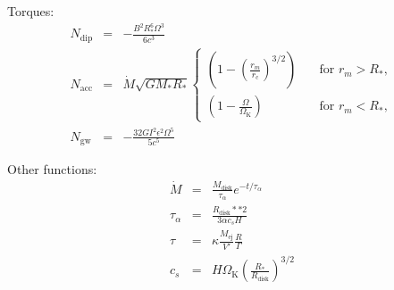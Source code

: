 \documentclass[11pt]{article} %
\newcommand{\tx}[1]{\textrm{#1}}
\begin{document}
Torques:
\begin{eqnarray}
N_\tx{dip}		&=& -\frac{B^2R_*^6\Omega^3}{6c^3} \\
N_\tx{acc}		&=& \dot{M}\sqrt{GM_*R_*}
				\left\{\begin{array}{ll} 
                                   \left(1-\left(\tfrac{r_m}{r_\tx{c}}\right)^{3/2}\right)&\quad\tx{for\ }r_m>R_*, \\
			        \left(1-\tfrac{\Omega}{\Omega_\tx{K}}\right)&\quad\tx{for\ }r_m<R_*,
			        \end{array}\right. \\
N_\tx{gw}		&=& -\frac{32GI^2\epsilon^2\Omega^5}{5c^5} 
\end{eqnarray}

Other functions:
\begin{eqnarray}
\dot{M}		&=& \frac{M_\tx{disk}}{\tau_\alpha}e^{-t/\tau_\alpha} \\
\tau_\alpha	&=& \frac{R_\tx{disk}**2}{3\alpha c_s H} \\
\tau			&=& \kappa\frac{M_\tx{ej}}{V'}\frac{R}{\Gamma} \\
c_s 			&=& H\Omega_\tx{K}\left(\tfrac{R_*}{R_\tx{disk}}\right)^{3/2}
\end{eqnarray} 



\end{document}
